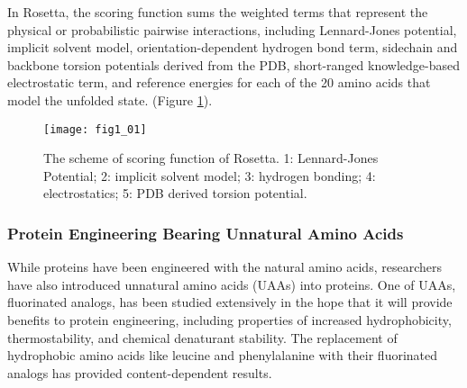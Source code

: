 \begin{refsection}
In Rosetta, the scoring function sums the weighted terms that represent the
physical or probabilistic pairwise interactions\cite{Rohl2004}, including
Lennard-Jones potential\cite{Clementi1999}, implicit solvent
model\cite{Lazaridis1999}, orientation-dependent hydrogen bond
term\cite{Kortemme2003}, sidechain and backbone torsion potentials derived from
the PDB\cite{Rohl2002}, short-ranged knowledge-based electrostatic
term\cite{Leaver-Fay2013a}, and reference energies for each of the 20 amino
acids that model the unfolded state\cite{Leaver-Fay2013a}. (Figure
\ref{fig:rosetta-intro}).
\begin{figure}[h!] \centering \texttt{[image: fig1\_01]}
    \caption[The scheme of scoring function of Rosetta. 1: Lennard-Jones
    Potential; 2: implicit solvent model; 3: hydrogen bonding; 4:
electrostatics; 5: PDB drived torsion potential.]{The scheme of scoring
    function of Rosetta. 1: Lennard-Jones Potential; 2: implicit solvent model;
3: hydrogen bonding; 4: electrostatics; 5: PDB derived torsion potential.}
\label{fig:rosetta-intro}
\end{figure}


\subsubsection{Protein Engineering Bearing Unnatural Amino Acids}
\label{sec:uaa-intro}

While proteins have been engineered with the natural amino acids, researchers
have also introduced unnatural amino acids (UAAs) into
proteins\cite{Odar2015,Hassan2008,Kiick2000,Hammill2007,Meinnel1990,Johnson2010}.
One of UAAs, fluorinated analogs, has been studied extensively in the hope that
it will provide benefits to protein engineering, including properties of
increased hydrophobicity\cite{Biffinger2004},
thermostability\cite{Voloshchuk2010,Baker2011b}, and chemical denaturant
stability\cite{Voloshchuk2007b}. The replacement of hydrophobic amino acids
like leucine and phenylalanine with their fluorinated analogs has provided
content-dependent results\cite{Tang2001}.


\end{refsection}
